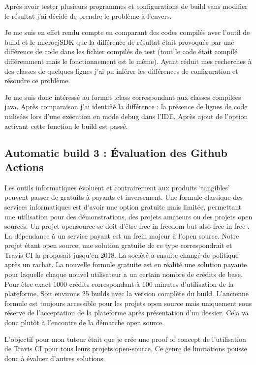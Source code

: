 \documentclass[french,a4paper,12pt]{report}
\begin{document}
Après avoir tester plusieurs programmes et configurations de build sans modifier le résultat j’ai décidé de prendre le problème à l’envers.

Je me suis en effet rendu compte en comparant des codes compilés avec l’outil de build et le microejSDK que la différence de résultat était provoquée par une différence de code dans les fichier compilés de test (tout le code était compilé différemment mais le fonctionnement est le même). Ayant réduit mes recherches à des classes de quelques lignes j’ai pu inférer les différences de configuration et résoudre ce problème.

Je me suis donc intéressé au format .class correspondant aux classes compilées java. 
Après comparaison j’ai identifié la différence : la présence de lignes de code utilisées lors d'une exécution en mode debug dans l’IDE. Après ajout de l’option activant cette fonction le build est passé.

\subsection{Automatic build 3 : Évaluation des Github Actions}

Les outils informatiques évoluent et contrairement aux produits ‘tangibles’ peuvent passer de gratuits à payants et inversement. Une formule classique des services informatiques est d’avoir une option gratuite mais limitée, permettant une utilisation pour des démonstrations, des projets amateurs ou des projets open sources. Un projet opensource se doit d’être free in freedom but also free in free . La dépendance à un service payant est un frein majeur à l’open source. Notre projet étant open source, une solution gratuite de ce type correspondrait et Travis CI la proposait jusqu’en 2018. La société a ensuite changé de politique après un rachat. La nouvelle formule gratuite est en réalité une solution payante pour laquelle chaque nouvel utilisateur a un certain nombre de crédits de base. Pour être exact 1000 crédits correspondant à 100 minutes d’utilisation de la plateforme. Soit environs 25 builds avec la version complète du build. L'ancienne formule est toujours accessible pour les projets open source mais uniquement sous réserve de l'acceptation de la plateforme après présentation d'un dossier. Cela va donc plutôt à l’encontre de la démarche open source.

L’objectif pour mon tuteur était que je crée une proof of concept de l’utilisation de Travis CI pour tous leurs projets open-source. Ce genre de limitations pousse donc à évaluer d'autres solutions.
\end{document}
